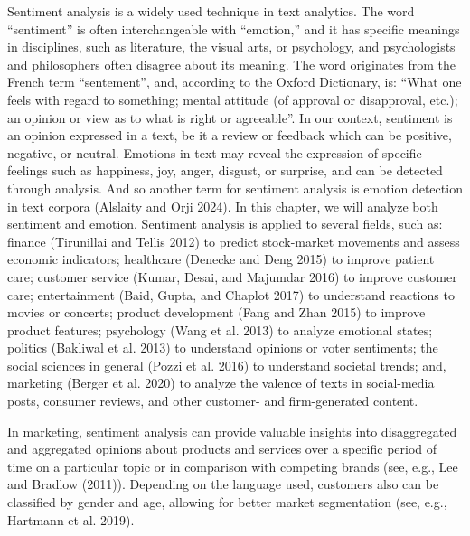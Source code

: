 Sentiment analysis is a widely used technique in text analytics. The
word ``sentiment'' is often interchangeable with ``emotion,'' and it
has specific meanings in disciplines, such as literature, the visual
arts, or psychology, and psychologists and philosophers often disagree about
its meaning. The word originates from the French term
``sentement'', and, according to the Oxford Dictionary, is: ``What one feels
with regard to something; mental attitude (of approval or disapproval,
etc.); an opinion or view as to what is right or agreeable''. In our
context, sentiment is an opinion expressed in a text, be it a review or
feedback which can be positive, negative, or neutral. Emotions in text may reveal
the expression of specific feelings such as happiness, joy, anger,
disgust, or surprise, and can be detected through analysis. And so another term for sentiment
analysis is emotion detection in text corpora (Alslaity and Orji 2024).
In this chapter, we will analyze both sentiment and emotion. Sentiment
analysis is applied to several fields, such as: finance (Tirunillai and
Tellis 2012) to predict stock-market movements and assess economic indicators;
healthcare (Denecke and Deng 2015) to improve patient care; customer
service (Kumar, Desai, and Majumdar 2016) to improve customer
care; entertainment (Baid, Gupta, and Chaplot 2017) to understand
reactions to movies or concerts; product development (Fang and Zhan
2015) to improve product features; psychology (Wang et al. 2013)
to analyze emotional states; politics (Bakliwal et al. 2013) to
understand opinions or voter sentiments; the social sciences in general
(Pozzi et al. 2016) to understand societal trends; and, marketing (Berger
et al. 2020) to analyze the valence of texts in social-media posts,
consumer reviews, and other customer- and firm-generated content.

In marketing, sentiment analysis can provide valuable insights into
disaggregated and aggregated opinions about products and services over a specific period of time on a particular topic or in comparison with
competing brands (see, e.g., Lee and Bradlow (2011)). Depending on the
language used, customers also can be classified by gender and age,
allowing for better market segmentation (see, e.g., Hartmann et al.
2019).

